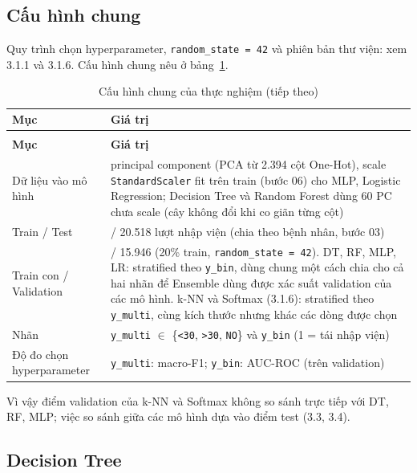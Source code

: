 \documentclass[a4paper]{report}
\begin{document}
\subsection{Cấu hình chung}

Quy trình chọn hyperparameter, \texttt{random\_\allowbreak{}state = 42} và phiên bản thư viện: xem 3.1.1 và 3.1.6. Cấu hình chung nêu ở bảng~\ref{tb:chung}.

{\small{}\renewcommand{}\setlength\tabcolsep{3pt}
\begin{longtable}{|>{\raggedright\arraybackslash}p{133.52pt}|>{\raggedright\arraybackslash}p{307.52pt}|}
\caption{Cấu hình chung của thực nghiệm}\label{tb:chung}\\
\hline
\textbf{Mục} & \textbf{Giá trị} \\ \hline\endfirsthead
\caption[]{Cấu hình chung của thực nghiệm (tiếp theo)}\\
\hline
\textbf{Mục} & \textbf{Giá trị} \\ \hline\endhead
Dữ liệu vào mô hình & 60 principal component (PCA từ 2.394 cột One-Hot), scale \texttt{StandardScaler} fit trên train (bước 06) cho MLP, Logistic Regression; Decision Tree và Random Forest dùng 60 PC chưa scale (cây không đổi khi co giãn từng cột) \\ \hline
Train / Test & 79.726 / 20.518 lượt nhập viện (chia theo bệnh nhân, bước 03) \\ \hline
Train con / Validation & 63.780 / 15.946 (20\% train, \texttt{random\_\allowbreak{}state = 42}). DT, RF, MLP, LR: stratified theo \texttt{y\_\allowbreak{}bin}, dùng chung một cách chia cho cả hai nhãn để Ensemble dùng được xác suất validation của các mô hình. k-NN và Softmax (3.1.6): stratified theo \texttt{y\_\allowbreak{}multi}, cùng kích thước nhưng khác các dòng được chọn \\ \hline
Nhãn & \texttt{y\_\allowbreak{}multi} $\in$ \{\texttt{<30}, \texttt{>30}, \texttt{NO}\} và \texttt{y\_\allowbreak{}bin} (1 = tái nhập viện) \\ \hline
Độ đo chọn hyperparameter & \texttt{y\_\allowbreak{}multi}: macro-F1; \texttt{y\_\allowbreak{}bin}: AUC-ROC (trên validation) \\ \hline
\end{longtable}
}

Vì vậy điểm validation của k-NN và Softmax không so sánh trực tiếp với DT, RF, MLP; việc so sánh giữa các mô hình dựa vào điểm test (3.3, 3.4).

\subsection{Decision Tree}
\end{document}
